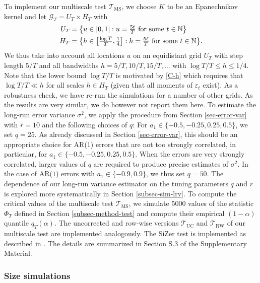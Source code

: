 To implement our multiscale test $\mathcal{T}_{\text{MS}}$, we choose $K$ to be an Epanechnikov kernel and let $\mathcal{G}_T = U_T \times H_T$ with 
\begin{align*}
U_T & = \big\{ u \in [0,1]: u = \textstyle{\frac{5t}{T}} \text{ for some } t \in \mathbb{N} \big\} \\
H_T & = \big\{ h \in \big[ \textstyle{\frac{\log T}{T}}, \textstyle{\frac{1}{4}} \big]:  h = \textstyle{\frac{5\ell}{T}} \text{ for some } t \in \mathbb{N} \big\}. 
\end{align*}
We thus take into account all locations $u$ on an equidistant grid $U_T$ with step length $5/T$ and all bandwidths $h=5/T, 10/T, 15/T,\ldots$ with $\log T /T \le h \le 1/4$. Note that the lower bound $\log T / T$ is motivated by \ref{C-h} which requires that $\log T /T \ll h$ for all scales $h \in H_T$ (given that all moments of $\varepsilon_t$ exist). As a robustness check, we have re-run the simulations for a number of other grids. As the results are very similar, we do however not report them here. 
To estimate the long-run error variance $\sigma^2$, we apply the procedure from Section \ref{sec-error-var} with $\overline{r}=10$ and the following choices of $q$: For $a_1 \in \{-0.5,-0.25,0.25,0.5\}$, we set $q = 25$. As already discussed in Section \ref{sec-error-var}, this should be an appropriate choice for AR(1) errors that are not too strongly correlated, in particular, for $a_1 \in \{-0.5,-0.25,0.25,0.5\}$. When the errors are very strongly correlated, larger values of $q$ are required to produce precise estimates of $\sigma^2$. In the case of AR($1$) errors with $a_1 \in \{-0.9,0.9\}$, we thus set $q = 50$. The dependence of our long-run variance estimator on the tuning parameters $q$ and $\overline{r}$ is explored more systematically in Section \ref{subsec-sim-lrv}. 
To compute the critical values of the multiscale test $\mathcal{T}_{\text{MS}}$, we simulate $5000$ values of the statistic $\Phi_T$ defined in Section \ref{subsec-method-test} and compute their empirical $(1-\alpha)$ quantile $q_T(\alpha)$. The uncorrected and row-wise versions $\mathcal{T}_{\text{UC}}$ and $\mathcal{T}_{\text{RW}}$ of our multiscale test are implemented analogously. The SiZer test is implemented as described in \cite{ParkHannigKang2009}. The details are summarized in Section S.3 of the Supplementary Material. 


\subsubsection{Size simulations}\label{subsec-sim-multiscale-size} 


